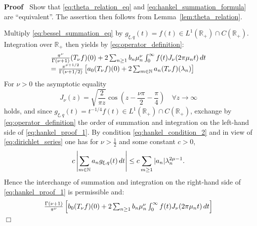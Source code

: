 \documentclass{article}
\newenvironment{proof}{\noindent\textbf{Proof\ }}{\hspace*{\fill}$\Box$\medskip}
\begin{document}
\begin{proof}
  Show that \eqref{eq:theta_relation_eq} and
  \eqref{eq:hankel_summation_formula} are ``equivalent''. The assertion then
  follows from Lemma~\ref{lem:theta_relation}.
  
  Multiply \eqref{eq:bessel_summation_eq} by $g_{\xi, q} (t) = f (t) \in L^1
  (\mathbb{R}_+) \cap C (\mathbb{R}_+)$. Integration over $\mathbb{R}_+$ then
  yields by \eqref{eq:operator_definition}:
  \begin{equation}
    \begin{array}{l}
      \text{} \frac{\pi^{\nu}}{\Gamma (\nu + 1)}  (T_{\nu} f) (0) + 2 \sum_{n
      \geq 1} b_n \mu_n^{\nu}  \int_0^{\infty} f (t) J_{\nu}  (2 \pi \mu_n t) 
      \hspace{0.17em} dt\\
      = \frac{\pi^{\nu + 1 / 2}}{\Gamma (\nu + 1 / 2)}  \left[ a_0 (T_{\nu} f)
      (0) + 2 \sum_{m \in \mathbb{N}} a_n (T_{\nu} f) (\lambda_n) \right]
    \end{array} \label{eq:hankel_proof_1}
  \end{equation}
  For $\nu > 0$ the asymptotic equality
  \begin{equation}
    J_{\nu} (z) = \sqrt{\frac{2}{\pi z}} \cos \left( z - \frac{\nu \pi}{2} -
    \frac{\pi}{4} \right) \quad \forall z \to \infty
    \label{eq:bessel_asymptotic}
  \end{equation}
  holds, and since $g_{\xi, q} (t) = t^{- 1 / 4} f (t) \in L^1 (\mathbb{R}_+)
  \cap C (\mathbb{R}_+)$, exchange by \eqref{eq:operator_definition} the order
  of summation and integration on the left-hand side of
  \eqref{eq:hankel_proof_1}. By condition \eqref{eq:hankel_condition_2} and in
  view of \eqref{eq:dirichlet_series} one has for $\nu > \frac{1}{2}$ and some
  constant $c > 0$,
  \begin{equation}
    c \left| \sum_{m \in \mathbb{N}} a_n g_{\xi, q} (t) \hspace{0.17em} dt
    \right| \leq c \sum_{m \geq 1} |a_n | \lambda_n^{2 \mu - 1} .
    \label{eq:hankel_bound}
  \end{equation}
  Hence the interchange of summation and integration on the right-hand side of
  \eqref{eq:hankel_proof_1} is permissible and:
  \begin{equation}
    \begin{array}{l}
      \frac{\Gamma (\nu + 1)}{\pi^{\nu}}  \left[ b_0 (T_{\nu} f) (0) + 2
      \sum_{n \geq 1} b_n \mu_n^{\nu}  \int_0^{\infty} f (t) J_{\nu} (2 \pi
      \mu_n t) \hspace{0.17em} dt \right]\\

\end{array}
\end{equation}
\end{proof}
\end{document}
